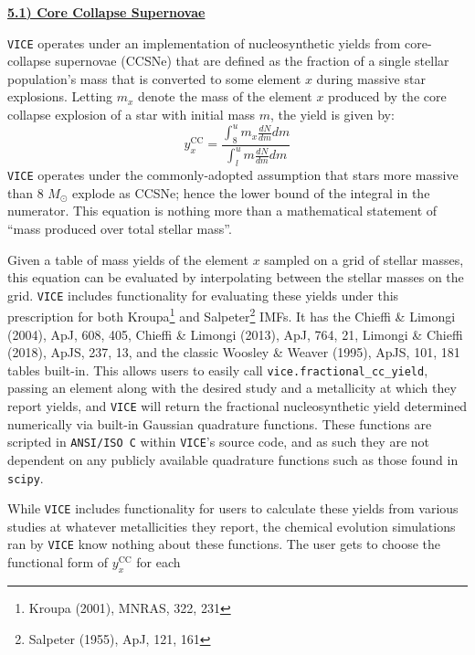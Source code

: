 \documentclass{report}
\newcommand\ddfrac[2]{\frac{\displaystyle #1}{\displaystyle #2}}
\begin{document}
\newpage 
\noindent 
\begin{center} 
\hypertarget{yields:ccsne}{
	\underline{\LARGE
		\textbf{5.1) Core Collapse Supernovae} 
	}
}
\end{center}
\texttt{VICE} operates under an implementation of nucleosynthetic yields from 
core-collapse supernovae (CCSNe) that are defined as the fraction of a single 
stellar population's mass that is converted to some element $x$ during massive 
star explosions. Letting $m_x$ denote the mass of the element $x$ produced by 
the core collapse explosion of a star with initial mass $m$, the yield is 
given by: 
\begin{equation}
\label{eq:ccsne_yield}
y_x^\text{CC} = \ddfrac{
	\int_8^u m_x\frac{dN}{dm}dm 
}{
	\int_l^u m\frac{dN}{dm}dm 
}
\end{equation}
\texttt{VICE} operates under the commonly-adopted assumption that stars more 
massive than 8 $M_\odot$ explode as CCSNe; hence the lower bound of the 
integral in the numerator. This equation is nothing more than a mathematical 
statement of ``mass produced over total stellar mass''. 
\par
Given a table of mass yields of the element $x$ sampled on a grid of stellar 
masses, this equation can be evaluated by interpolating between the stellar 
masses on the grid. \texttt{VICE} includes functionality for evaluating these 
yields under this prescription for both Kroupa\footnote{
	Kroupa (2001), MNRAS, 322, 231
} and Salpeter\footnote{
	Salpeter (1955), ApJ, 121, 161
} IMFs. It has the Chieffi \& Limongi (2004), ApJ, 608, 405, Chieffi \& 
Limongi (2013), ApJ, 764, 21, Limongi \& Chieffi (2018), ApJS, 
237, 13, and the classic Woosley \& Weaver (1995), ApJS, 101, 181 tables 
built-in. This allows users to easily call \texttt{vice.fractional\_cc\_yield}, 
passing an element along with the desired study and a metallicity at which 
they report yields, and \texttt{VICE} will return the fractional 
nucleosynthetic yield determined numerically via built-in Gaussian quadrature 
functions. These functions are scripted in \texttt{ANSI/ISO C} within 
\texttt{VICE}'s source code, and as such they are not dependent on any 
publicly available quadrature functions such as those found in \texttt{scipy}. 
\par 
While \texttt{VICE} includes functionality for users to calculate these yields 
from various studies at whatever metallicities they report, the chemical 
evolution simulations ran by \texttt{VICE} know nothing about these functions. 
The user gets to choose the functional form of $y_x^\text{CC}$ for each 
\end{document}
